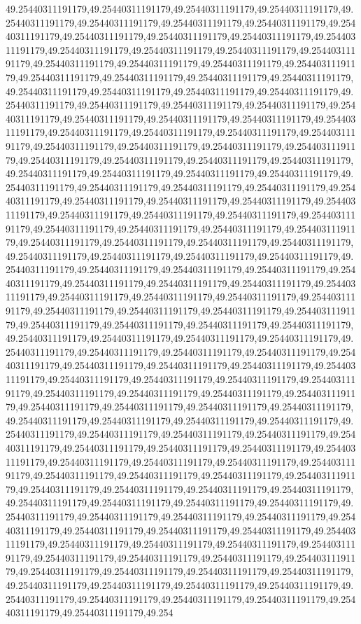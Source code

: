 49.25440311191179,49.25440311191179,49.25440311191179,49.25440311191179,49.25440311191179,49.25440311191179,49.25440311191179,49.25440311191179,49.25440311191179,49.25440311191179,49.25440311191179,49.25440311191179,49.25440311191179,49.25440311191179,49.25440311191179,49.25440311191179,49.25440311191179,49.25440311191179,49.25440311191179,49.25440311191179,49.25440311191179,49.25440311191179,49.25440311191179,49.25440311191179,49.25440311191179,49.25440311191179,49.25440311191179,49.25440311191179,49.25440311191179,49.25440311191179,49.25440311191179,49.25440311191179,49.25440311191179,49.25440311191179,49.25440311191179,49.25440311191179,49.25440311191179,49.25440311191179,49.25440311191179,49.25440311191179,49.25440311191179,49.25440311191179,49.25440311191179,49.25440311191179,49.25440311191179,49.25440311191179,49.25440311191179,49.25440311191179,49.25440311191179,49.25440311191179,49.25440311191179,49.25440311191179,49.25440311191179,49.25440311191179,49.25440311191179,49.25440311191179,49.25440311191179,49.25440311191179,49.25440311191179,49.25440311191179,49.25440311191179,49.25440311191179,49.25440311191179,49.25440311191179,49.25440311191179,49.25440311191179,49.25440311191179,49.25440311191179,49.25440311191179,49.25440311191179,49.25440311191179,49.25440311191179,49.25440311191179,49.25440311191179,49.25440311191179,49.25440311191179,49.25440311191179,49.25440311191179,49.25440311191179,49.25440311191179,49.25440311191179,49.25440311191179,49.25440311191179,49.25440311191179,49.25440311191179,49.25440311191179,49.25440311191179,49.25440311191179,49.25440311191179,49.25440311191179,49.25440311191179,49.25440311191179,49.25440311191179,49.25440311191179,49.25440311191179,49.25440311191179,49.25440311191179,49.25440311191179,49.25440311191179,49.25440311191179,49.25440311191179,49.25440311191179,49.25440311191179,49.25440311191179,49.25440311191179,49.25440311191179,49.25440311191179,49.25440311191179,49.25440311191179,49.25440311191179,49.25440311191179,49.25440311191179,49.25440311191179,49.25440311191179,49.25440311191179,49.25440311191179,49.25440311191179,49.25440311191179,49.25440311191179,49.25440311191179,49.25440311191179,49.25440311191179,49.25440311191179,49.25440311191179,49.25440311191179,49.25440311191179,49.25440311191179,49.25440311191179,49.25440311191179,49.25440311191179,49.25440311191179,49.25440311191179,49.25440311191179,49.25440311191179,49.25440311191179,49.25440311191179,49.25440311191179,49.25440311191179,49.25440311191179,49.25440311191179,49.25440311191179,49.25440311191179,49.25440311191179,49.25440311191179,49.25440311191179,49.25440311191179,49.25440311191179,49.25440311191179,49.25440311191179,49.25440311191179,49.25440311191179,49.25440311191179,49.25440311191179,49.25440311191179,49.25440311191179,49.25440311191179,49.25440311191179,49.25440311191179,49.25440311191179,49.25440311191179,49.25440311191179,49.25440311191179,49.25440311191179,49.25440311191179,49.25440311191179,49.25440311191179,49.25440311191179,49.25440311191179,49.25440311191179,49.25440311191179,49.25440311191179,49.25440311191179,49.25440311191179,49.25440311191179,49.25440311191179,49.25440311191179,49.25440311191179,49.25440311191179,49.25440311191179,49.25440311191179,49.25440311191179,49.25440311191179,49.25440311191179,49.25440311191179,49.25440311191179,49.254